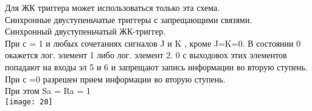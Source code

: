 Для ЖК триггера может использоваться только эта схема.\\


Синхронные двуступеньчатые триггеры с запрещающими связями.\\
Синхронный двуступеньчатый ЖК-триггер.\\

При с = 1 и любых сочетаниях сигналов J и K , кроме J=K=0. В состоянии 0 окажется лог. элемент 1 либо лог. элемент 2.
0 с выходовох этих элементов попадают на входы эл 5 и 6 и запрещают запись информации во вторую ступень.\\
При с =0 разрешен прием информации во вторую ступень.\\
При этом Sa = Ra = 1 \\
\texttt{[image: 20]}






